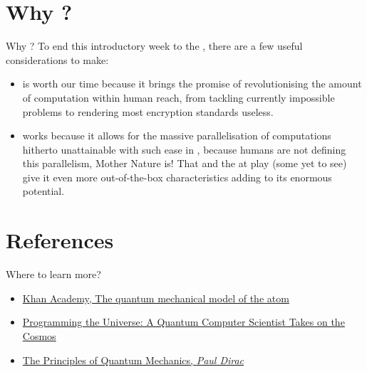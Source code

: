 \documentclass[aspectratio=43]{beamer}
\begin{document}
\section{Why \q?}
\begin{frame}{Why \q?}
    To end this introductory week to the \qw, there are a few useful considerations to make:
    \begin{itemize}
        \item \qc is worth our time because it brings the promise of revolutionising the amount of computation within human reach, from tackling currently impossible problems to rendering most encryption standards useless.
        \item \qc works because it allows for the massive parallelisation of computations hitherto unattainable with such ease in \cc, because humans are not defining this parallelism, Mother Nature is! That and the \qm at play (some yet to see) give it even more out-of-the-box characteristics adding to its enormous potential.
    \end{itemize}
\pagenumber
\end{frame}

\section{References}
\begin{frame}{Where to learn more?}
\begin{card}
    \begin{itemize}
        \item \href{https://www.khanacademy.org/science/physics/quantum-physics/quantum-numbers-and-orbitals/a/the-quantum-mechanical-model-of-the-atom}{Khan Academy, The quantum mechanical model of the atom}
        \item \href{https://www.goodreads.com/book/show/331680.Programming_the_Universe}{Programming the Universe: A Quantum Computer Scientist Takes on the Cosmos}
        \item \href{https://www.goodreads.com/book/show/260142.The_Principles_of_Quantum_Mechanics}{The Principles of Quantum Mechanics, \textit{Paul Dirac}}
    \end{itemize}
\end{card}
\end{frame}
\end{document}
